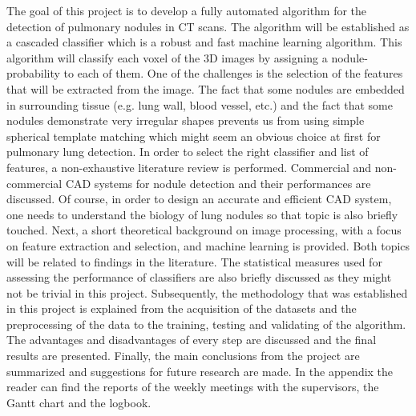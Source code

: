 The goal of this project is to develop a fully automated algorithm for the
detection of pulmonary nodules in CT scans. The algorithm will be established as
a cascaded classifier which is a robust and fast machine learning algorithm.
This algorithm will classify each voxel of the 3D images by assigning a
nodule-probability to each of them. One of the challenges is the selection of
the features that will be extracted from the image. The fact that some nodules
are embedded in surrounding tissue (e.g. lung wall, blood vessel, etc.) and the
fact that some nodules demonstrate very irregular shapes prevents us from using
simple spherical template matching which might seem an obvious choice at first
for pulmonary lung detection. In order to select the right classifier and list
of features, a non-exhaustive literature review is performed. Commercial and
non-commercial CAD systems for nodule detection and their performances are
discussed. Of course, in order to design an accurate and efficient CAD system,
one needs to understand the biology of lung nodules so that topic is also
briefly touched. Next, a short theoretical background on image processing, with
a focus on feature extraction and selection, and machine learning is provided.
Both topics will be related to findings in the literature. The statistical
measures used for assessing the performance of classifiers are also briefly
discussed as they might not be trivial in this project. Subsequently, the
methodology that was established in this project is explained from the
acquisition of the datasets and the preprocessing of the data to the training,
testing and validating of the algorithm. The advantages and disadvantages of
every step are discussed and the final results are presented. Finally, the main
conclusions from the project are summarized and suggestions for future research
are made. In the appendix the reader can find the reports of the weekly meetings
with the supervisors, the Gantt chart and the logbook.






